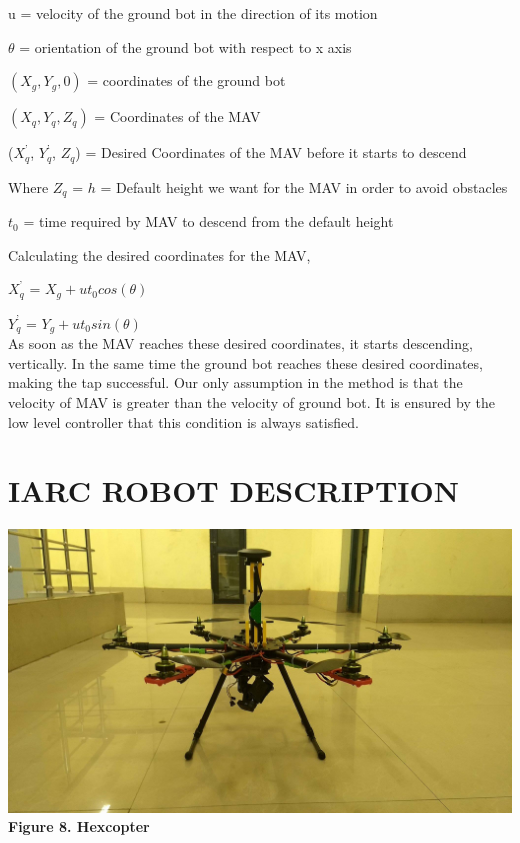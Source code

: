 \documentclass[12pt]{article}
\begin{document}
u = velocity of the ground bot in the direction of its motion 

$\theta$ = orientation of the ground bot with respect to x axis 

$(X_g, Y_g, 0)$ = coordinates of the ground bot 

$(X_q, Y_q, Z_q)$ = Coordinates of the MAV 

($X_q^’$, $Y_q^’$, $Z_q$) = Desired Coordinates of the MAV before it starts to descend 

Where $Z_q$ = $h$ = Default height we want for the MAV in order to avoid obstacles 
        
$t_0$ = time required by MAV to descend from the default height 
 
Calculating the desired coordinates for the MAV, 
 
$X_q^’$ = $X_g + ut_0cos(\theta)$

$Y_q^’$  = $Y_g + ut_0sin(\theta)$ \\
    As soon as the MAV reaches these desired coordinates, it starts descending, vertically. In the same time the ground bot reaches these desired coordinates, making the tap successful. 
    Our only assumption in the method is that the velocity of MAV is greater than the velocity of ground bot. It is ensured by the low level controller that this condition is always satisfied.
\section{IARC ROBOT DESCRIPTION}
\begin{center}\includegraphics[scale=0.15]{hex} \\
\textbf{Figure 8. Hexcopter}\end{center}\\
\end{document}
